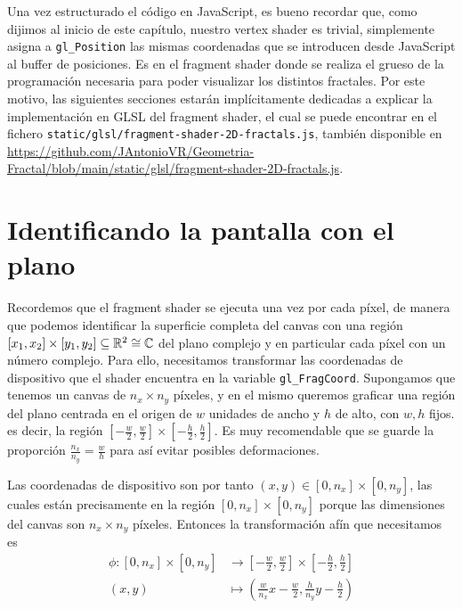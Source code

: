 Una vez estructurado el código en JavaScript, es bueno recordar que, como dijimos al inicio de este capítulo, nuestro vertex shader es trivial, simplemente asigna a \verb|gl_Position| las mismas coordenadas que se introducen desde JavaScript al buffer de posiciones. Es en el fragment shader donde se realiza el grueso de la programación necesaria para poder visualizar los distintos fractales. Por este motivo, las siguientes secciones estarán implícitamente dedicadas a explicar la implementación en GLSL del fragment shader, el cual se puede encontrar en el fichero \verb|static/glsl/fragment-shader-2D-fractals.js|, también disponible en \url{https://github.com/JAntonioVR/Geometria-Fractal/blob/main/static/glsl/fragment-shader-2D-fractals.js}. 

\section{Identificando la pantalla con el plano}
\label{section:pantalla-plano}


Recordemos que el fragment shader se ejecuta una vez por cada píxel, de manera que podemos identificar la superficie completa del canvas con una región $[x_1,x_2]\times [y_1,y_2]\subseteq\mathbb{R}^2\cong\mathbb{C}$ del plano complejo y en particular cada píxel con un número complejo. Para ello, necesitamos transformar las coordenadas de dispositivo que el shader encuentra en la variable \verb|gl_FragCoord|. Supongamos que tenemos un canvas de $n_x\times n_y$ píxeles, y en el mismo queremos graficar una región del plano centrada en el origen de $w$ unidades de ancho y $h$ de alto, con $w,h$ fijos. es decir, la región $\left[-\frac{w}{2},\frac{w}{2}\right]\times\left[-\frac{h}{2},\frac{h}{2}\right]$. Es muy recomendable que se guarde la proporción $\frac{n_x}{n_y}=\frac{w}{h}$ para así evitar posibles deformaciones.

Las coordenadas de dispositivo son por tanto $(x,y)\in[0,n_x]\times[0,n_y]$, las cuales están precisamente en la región $[0,n_x]\times[0,n_y]$ porque las dimensiones del canvas son $n_x\times n_y$ píxeles. Entonces la transformación afín que necesitamos es 
\begin{equation}
\label{eq:transformacion-lineal-1}
\begin{split}
    \phi:[0,n_x]\times[0,n_y] & \longrightarrow \left[-\frac{w}{2},\frac{w}{2}\right]\times\left[-\frac{h}{2},\frac{h}{2}\right] \\
    (x,y) & \longmapsto \left(\frac{w}{n_x}x-\frac{w}{2},\frac{h}{n_y}y-\frac{h}{2}\right)
\end{split}
\end{equation}

